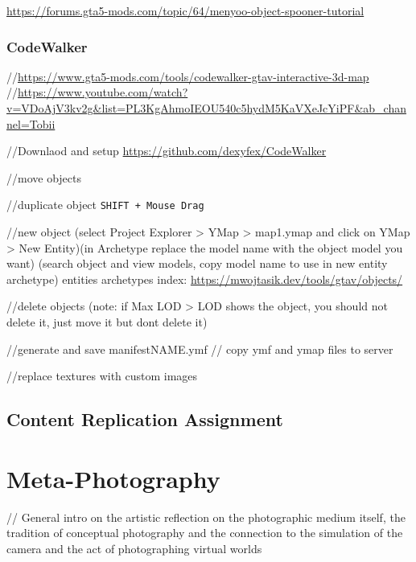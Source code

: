 \documentclass[
  openany]{book}
\begin{document}
\url{https://forums.gta5-mods.com/topic/64/menyoo-object-spooner-tutorial}

\hypertarget{codewalker}{%
\subsection*{CodeWalker}\label{codewalker}}

//\url{https://www.gta5-mods.com/tools/codewalker-gtav-interactive-3d-map}
//\url{https://www.youtube.com/watch?v=VDoAjV3kv2g\&list=PL3KgAhmoIEOU540c5hydM5KaVXeJcYiPF\&ab_channel=Tobii}

//Downlaod and setup \url{https://github.com/dexyfex/CodeWalker}

//move objects

//duplicate object \texttt{SHIFT\ +\ Mouse\ Drag}

//new object (select Project Explorer \textgreater{} YMap \textgreater{} map1.ymap and click on YMap \textgreater{} New Entity)(in Archetype replace the model name with the object model you want) (search object and view models, copy model name to use in new entity archetype)
entities archetypes index: \url{https://mwojtasik.dev/tools/gtav/objects/}

//delete objects (note: if Max LOD \textgreater{} LOD shows the object, you should not delete it, just move it but dont delete it)

//generate and save manifestNAME.ymf // copy ymf and ymap files to server

//replace textures with custom images

\hypertarget{content-replication-assignment-6}{%
\section*{Content Replication Assignment}\label{content-replication-assignment-6}}

\hypertarget{meta-photography}{%
\chapter{Meta-Photography}\label{meta-photography}}

// General intro on the artistic reflection on the photographic medium itself, the tradition of conceptual photography and the connection to the simulation of the camera and the act of photographing virtual worlds
\end{document}
